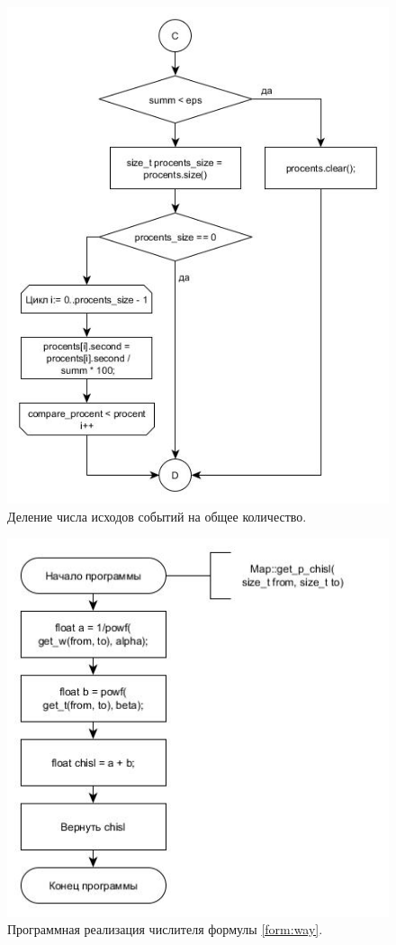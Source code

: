 \documentclass[a4paper, 14pt]{article}
\begin{document}
\begin{figure}[h!]
\center
\includegraphics[scale=0.6]{get_p_3_cd.jpg}
\caption{Деление числа исходов событий на общее количество.}
\label{ris:get_p_3}
\end{figure}\newpage

\begin{figure}[h!]
\center
\includegraphics[scale=0.6]{get_p_chisl.jpg}
\caption{Программная реализация числителя формулы \ref{form:way}.}
\label{ris:get_p_chisl}
\end{figure}\newpage
\end{document}
